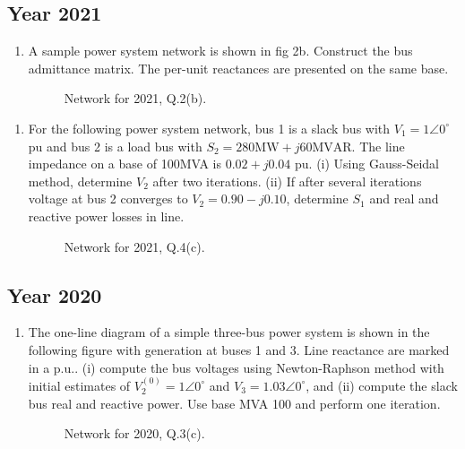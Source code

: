 \documentclass[12pt, a4paper]{article}
\begin{document}
	\subsection{Year 2021}
	\begin{enumerate}[label=\textbf{Q2(b).}, wide, labelindent=0pt]
		\item A sample power system network is shown in fig 2b. Construct the bus admittance matrix. The per-unit reactances are presented on the same base.
		\begin{figure}[h!]
			\centering
			\caption{Network for 2021, Q.2(b).}
		\end{figure}
	\end{enumerate}
	\begin{enumerate}[label=\textbf{Q4(c).}, wide, labelindent=0pt]
		\item For the following power system network, bus 1 is a slack bus with $V_1 = 1\angle 0^\circ$ pu and bus 2 is a load bus with $S_2 = 280\text{MW} + j60\text{MVAR}$. The line impedance on a base of 100MVA is $0.02 + j0.04$ pu.
		(i) Using Gauss-Seidal method, determine $V_2$ after two iterations.
		(ii) If after several iterations voltage at bus 2 converges to $V_2 = 0.90 - j0.10$, determine $S_1$ and real and reactive power losses in line.
		\begin{figure}[h!]
			\centering
			\caption{Network for 2021, Q.4(c).}
		\end{figure}
	\end{enumerate}
	
	\subsection{Year 2020}
	\begin{enumerate}[label=\textbf{Q3(c).}, wide, labelindent=0pt]
		\item The one-line diagram of a simple three-bus power system is shown in the following figure with generation at buses 1 and 3. Line reactance are marked in a p.u.. (i) compute the bus voltages using Newton-Raphson method with initial estimates of $V_2^{(0)} = 1\angle 0^\circ$ and $V_3 = 1.03\angle 0^\circ$, and (ii) compute the slack bus real and reactive power. Use base MVA 100 and perform one iteration.
		\begin{figure}[h!]
			\centering
			\caption{Network for 2020, Q.3(c).}
		\end{figure}
	\end{enumerate}
	
\end{document}
